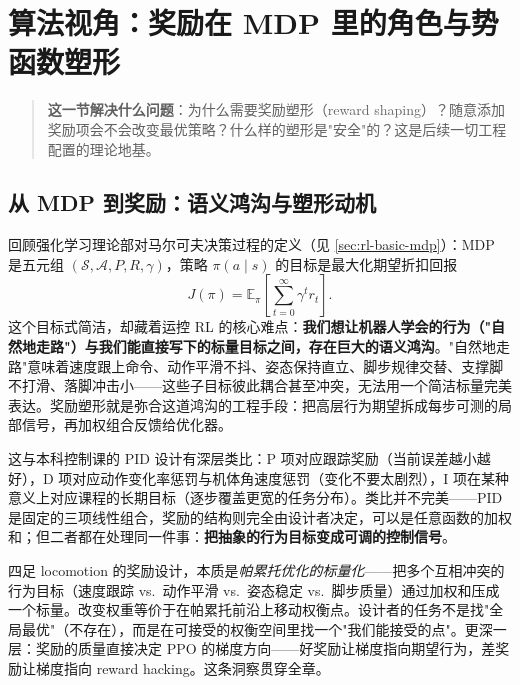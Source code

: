 \section{算法视角：奖励在 MDP 里的角色与势函数塑形}
\label{sec:rlmc-rew-theory}

\begin{quote}\small
\textbf{这一节解决什么问题}：为什么需要奖励塑形（reward shaping）？随意添加奖励项会不会改变最优策略？什么样的塑形是"安全"的？这是后续一切工程配置的理论地基。
\end{quote}

\subsection{从 MDP 到奖励：语义鸿沟与塑形动机}
\label{sec:rlmc-rew-gap}

回顾强化学习理论部对马尔可夫决策过程的定义（见 \cref{sec:rl-basic-mdp}）：MDP 是五元组 $(\mathcal S,\mathcal A,P,R,\gamma)$，策略 $\pi(a\mid s)$ 的目标是最大化期望折扣回报
\begin{equation}
J(\pi)=\mathbb E_{\pi}\!\left[\sum_{t=0}^{\infty}\gamma^{t} r_t\right].
\label{eq:rlmc-rew-return}
\end{equation}
这个目标式简洁，却藏着运控 RL 的核心难点：\textbf{我们想让机器人学会的行为（"自然地走路"）与我们能直接写下的标量目标之间，存在巨大的语义鸿沟}。"自然地走路"意味着速度跟上命令、动作平滑不抖、姿态保持直立、脚步规律交替、支撑脚不打滑、落脚冲击小——这些子目标彼此耦合甚至冲突，无法用一个简洁标量完美表达。奖励塑形就是弥合这道鸿沟的工程手段：把高层行为期望拆成每步可测的局部信号，再加权组合反馈给优化器。

这与本科控制课的 PID 设计有深层类比：P 项对应跟踪奖励（当前误差越小越好），D 项对应动作变化率惩罚与机体角速度惩罚（变化不要太剧烈），I 项在某种意义上对应课程的长期目标（逐步覆盖更宽的任务分布）。类比并不完美——PID 是固定的三项线性组合，奖励的结构则完全由设计者决定，可以是任意函数的加权和；但二者都在处理同一件事：\textbf{把抽象的行为目标变成可调的控制信号}。

\begin{insight}\label{ins:rlmc-rew-shaping}
四足 locomotion 的奖励设计，本质是\emph{帕累托优化的标量化}——把多个互相冲突的行为目标（速度跟踪 vs.\ 动作平滑 vs.\ 姿态稳定 vs.\ 脚步质量）通过加权和压成一个标量。改变权重等价于在帕累托前沿上移动权衡点。设计者的任务不是找"全局最优"（不存在），而是在可接受的权衡空间里找一个"我们能接受的点"。更深一层：奖励的质量直接决定 PPO 的梯度方向——好奖励让梯度指向期望行为，差奖励让梯度指向 reward hacking。这条洞察贯穿全章。
\end{insight}


